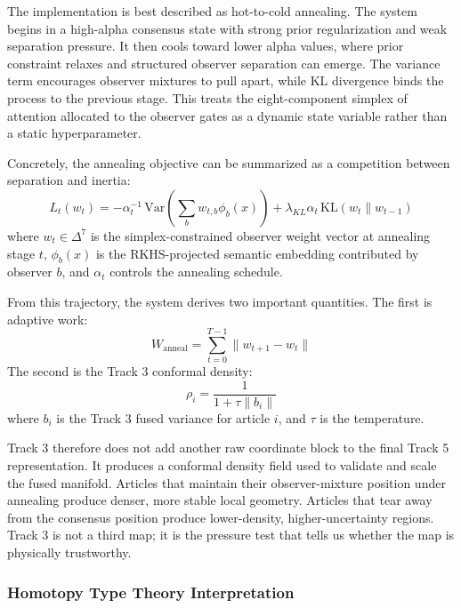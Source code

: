 The implementation is best described as hot-to-cold annealing. The system begins in a high-alpha consensus state with strong prior regularization and weak separation pressure. It then cools toward lower alpha values, where prior constraint relaxes and structured observer separation can emerge. The variance term encourages observer mixtures to pull apart, while KL divergence binds the process to the previous stage. This treats the eight-component simplex of attention allocated to the observer gates as a dynamic state variable rather than a static hyperparameter.

Concretely, the annealing objective can be summarized as a competition between separation and inertia:
\begin{equation}
    L_t(w_t) = -\alpha_t^{-1}\,\mathrm{Var}\left(\sum_b w_{t,b}\phi_b(x)\right) + \lambda_{KL}\alpha_t\,\mathrm{KL}(w_t\|w_{t-1})
\end{equation}
where $w_t \in \Delta^7$ is the simplex-constrained observer weight vector at annealing stage $t$, $\phi_b(x)$ is the RKHS-projected semantic embedding contributed by observer $b$, and $\alpha_t$ controls the annealing schedule.

From this trajectory, the system derives two important quantities. The first is adaptive work:
\begin{equation}
    W_{\text{anneal}} = \sum_{t=0}^{T-1} \|w_{t+1} - w_t\|
\end{equation}
The second is the Track 3 conformal density:
\begin{equation}
    \rho_i = \frac{1}{1 + \tau \|b_i\|}
\end{equation}
where $b_i$ is the Track 3 fused variance for article $i$, and $\tau$ is the temperature.

Track 3 therefore does not add another raw coordinate block to the final Track 5 representation. It produces a conformal density field used to validate and scale the fused manifold. Articles that maintain their observer-mixture position under annealing produce denser, more stable local geometry. Articles that tear away from the consensus position produce lower-density, higher-uncertainty regions. Track 3 is not a third map; it is the pressure test that tells us whether the map is physically trustworthy.

\subsubsection{Homotopy Type Theory Interpretation}

